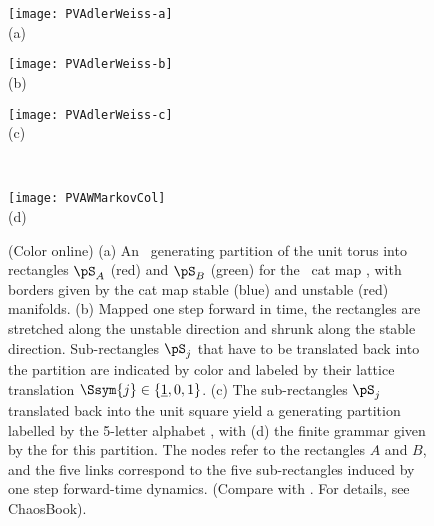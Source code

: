 \begin{description}
\begin{figure}\begin{center}
            \begin{minipage}[c]{0.23\textwidth}\begin{center}
\texttt{[image: PVAdlerWeiss-a]}\\(a)
            \end{center}\end{minipage}
            \begin{minipage}[c]{0.23\textwidth}\begin{center}
\texttt{[image: PVAdlerWeiss-b]}\\(b)
            \end{center}\end{minipage}
            \begin{minipage}[c]{0.23\textwidth}\begin{center}
\texttt{[image: PVAdlerWeiss-c]}\\(c)
            \end{center}\end{minipage}
            ~~~
            \begin{minipage}[c]{0.12\textwidth}\begin{center}
\texttt{[image: PVAWMarkovCol]}\\(d)
            \end{center}\end{minipage}
\end{center}
  \caption{\label{fig:PVAdlerWeiss2HL}
(Color online)
(a)
An \AW\ generating partition of the unit torus into rectangles
$\pS_A$ (red) and $\pS_B$ (green) for the \PV\ cat map
, with borders given by the cat map stable (blue) and
unstable (red) manifolds.
(b)
Mapped one step forward in time, the rectangles are stretched along the
unstable direction and shrunk along the stable direction. Sub-rectangles
$\pS_j$ that have to be translated back into the partition are indicated by
color and labeled by their lattice translation $\Ssym{j}\in\{\underline{1},0,1\}$.
(c)
The sub-rectangles $\pS_j$ translated back into the unit square yield a
generating partition labelled by the 5-letter alphabet ,
with
(d)
the finite grammar given by the {\markGraph} for this partition. The nodes
refer to the rectangles $A$ and $B$, and the five links correspond to the five
sub-rectangles induced by one step forward-time dynamics.
(Compare with . For details, see ChaosBook).
}
\end{figure}


\end{description}
